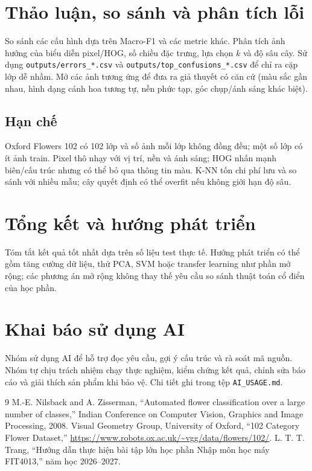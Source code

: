 \documentclass[12pt,a4paper]{report}
\begin{document}
\chapter{Thảo luận, so sánh và phân tích lỗi}
So sánh các cấu hình dựa trên Macro-F1 và các metric khác. Phân tích ảnh hưởng của biểu diễn pixel/HOG, số chiều đặc trưng, lựa chọn $k$ và độ sâu cây. Sử dụng \texttt{outputs/errors\_*.csv} và \texttt{outputs/top\_confusions\_*.csv} để chỉ ra cặp lớp dễ nhầm. Mở các ảnh tương ứng để đưa ra giả thuyết có căn cứ (màu sắc gần nhau, hình dạng cánh hoa tương tự, nền phức tạp, góc chụp/ánh sáng khác biệt).

\section{Hạn chế}
Oxford Flowers 102 có 102 lớp và số ảnh mỗi lớp không đồng đều; một số lớp có ít ảnh train. Pixel thô nhạy với vị trí, nền và ánh sáng; HOG nhấn mạnh biên/cấu trúc nhưng có thể bỏ qua thông tin màu. K-NN tốn chi phí lưu và so sánh với nhiều mẫu; cây quyết định có thể overfit nếu không giới hạn độ sâu.

\chapter{Tổng kết và hướng phát triển}
Tóm tắt kết quả tốt nhất dựa trên số liệu test thực tế. Hướng phát triển có thể gồm tăng cường dữ liệu, thử PCA, SVM hoặc transfer learning như phần mở rộng; các phương án mở rộng không thay thế yêu cầu so sánh thuật toán cổ điển của học phần.

\appendix
\chapter{Khai báo sử dụng AI}
Nhóm sử dụng AI để hỗ trợ đọc yêu cầu, gợi ý cấu trúc và rà soát mã nguồn. Nhóm tự chịu trách nhiệm chạy thực nghiệm, kiểm chứng kết quả, chỉnh sửa báo cáo và giải thích sản phẩm khi bảo vệ. Chi tiết ghi trong tệp \texttt{AI\_USAGE.md}.

\begin{thebibliography}{9}
 M.-E. Nilsback and A. Zisserman, ``Automated flower classification over a large number of classes,'' Indian Conference on Computer Vision, Graphics and Image Processing, 2008.
 Visual Geometry Group, University of Oxford, ``102 Category Flower Dataset,'' \url{https://www.robots.ox.ac.uk/~vgg/data/flowers/102/}.
 L. T. T. Trang, ``Hướng dẫn thực hiện bài tập lớn học phần Nhập môn học máy FIT4013,'' năm học 2026--2027.
\end{thebibliography}
\end{document}
